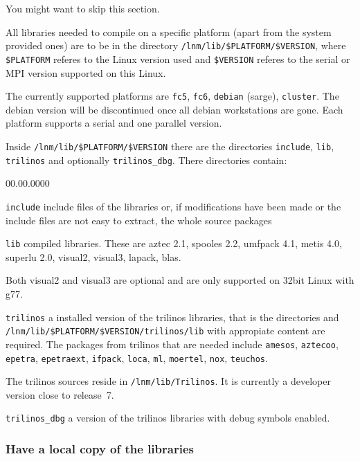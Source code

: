 You might want to skip this section.

All libraries needed to compile \ccarat{} on a specific platform
(apart from the system provided ones) are to be in the directory \texttt{/lnm/lib/\$PLATFORM/\$VERSION},
where \texttt{\$PLATFORM} referes to the Linux version used and \texttt{\$VERSION}
referes to the serial or MPI version supported on this Linux.

The currently supported platforms are \texttt{fc5}, \texttt{fc6},
\texttt{debian} (sarge), \texttt{cluster}. The debian version will
be discontinued once all debian workstations are gone. Each platform
supports a serial and one parallel version.

Inside \texttt{/lnm/lib/\$PLATFORM/\$VERSION} there are the directories
\texttt{include}, \texttt{lib}, \texttt{trilinos} and optionally \texttt{trilinos\_dbg}.
There directories contain:

\begin{lyxlist}{00.00.0000}
\item [{\texttt{include}}] include files of the libraries or, if modifications
have been made or the include files are not easy to extract, the whole
source packages
\item [{\texttt{lib}}] compiled libraries. These are aztec 2.1, spooles
2.2, umfpack 4.1, metis 4.0, superlu 2.0, visual2, visual3, lapack,
blas.


Both visual2 and visual3 are optional and are only supported on 32bit
Linux with g77.

\item [{\texttt{trilinos}}] a installed version of the trilinos libraries,
that is the directories 
and \texttt{/lnm/lib/\$PLATFORM/\$VERSION/trilinos/lib} with appropiate
content are required. The packages from trilinos that are needed include
\texttt{amesos}, \texttt{aztecoo}, \texttt{epetra}, \texttt{epetraext},
\texttt{ifpack}, \texttt{loca}, \texttt{ml}, \texttt{moertel}, \texttt{nox},
\texttt{teuchos}.


The trilinos sources reside in \texttt{/lnm/lib/Trilinos}. It is currently
a developer version close to release~7.

\item [{\texttt{trilinos\_dbg}}] a version of the trilinos libraries with
debug symbols enabled.
\end{lyxlist}

\subsubsection{Have a local copy of the \ccarat{} libraries}

